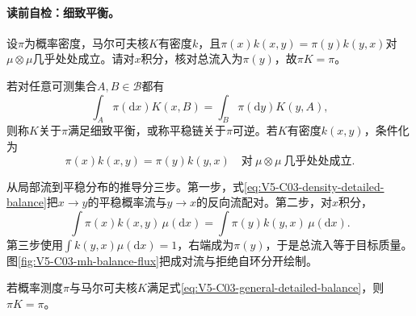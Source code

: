 \paragraph{读前自检：细致平衡。}设$\pi$为概率密度，马尔可夫核$K$有密度$k$，且$\pi(x)k(x,y)=\pi(y)k(y,x)$对$\mu\otimes\mu$几乎处处成立。请对$x$积分，核对总流入为$\pi(y)$，故$\pi K=\pi$。\par

\begin{definition}[细致平衡]
若对任意可测集合$A,B\in\mathcal B$都有
\begin{equation}\label{eq:V5-C03-general-detailed-balance}
\int_A\pi(\mathrm dx)K(x,B)
=\int_B\pi(\mathrm dy)K(y,A),
\end{equation}
则称$K$关于$\pi$满足细致平衡，或称平稳链关于$\pi$可逆。若$K$有密度$k(x,y)$，条件化为
\begin{equation}\label{eq:V5-C03-density-detailed-balance}
\pi(x)k(x,y)=\pi(y)k(y,x)
\quad\text{对}\ \mu\otimes\mu\ \text{几乎处处成立}.
\end{equation}
\end{definition}

从局部流到平稳分布的推导分三步。第一步，式\eqref{eq:V5-C03-density-detailed-balance}把$x\to y$的平稳概率流与$y\to x$的反向流配对。第二步，对$x$积分，
\[
\int\pi(x)k(x,y)\,\mu(\mathrm dx)
=\int\pi(y)k(y,x)\,\mu(\mathrm dx).
\]
第三步使用$\int k(y,x)\mu(\mathrm dx)=1$，右端成为$\pi(y)$，于是总流入等于目标质量。图\ref{fig:V5-C03-mh-balance-flux}把成对流与拒绝自环分开绘制。


\begin{proposition}[细致平衡推出平稳]\label{prop:V5-C03-db-stationary}
若概率测度$\pi$与马尔可夫核$K$满足式\eqref{eq:V5-C03-general-detailed-balance}，则$\pi K=\pi$。
\end{proposition}
